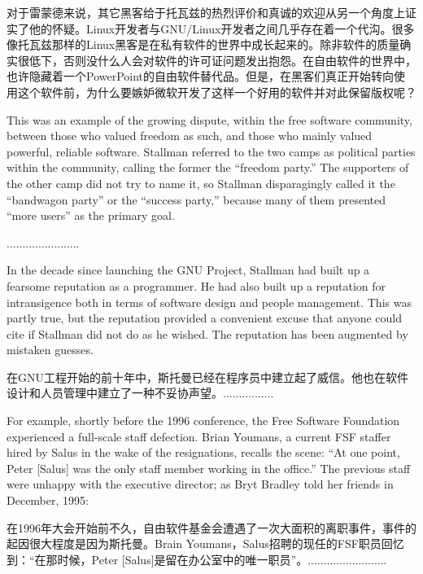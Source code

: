 \ifdefined\chs
对于雷蒙德来说，其它黑客给于托瓦兹的热烈评价和真诚的欢迎从另一个角度上证实了他的怀疑。Linux开发者与GNU/Linux开发者之间几乎存在着一个代沟。很多像托瓦兹那样的Linux黑客是在私有软件的世界中成长起来的。除非软件的质量确实很低下，否则没什么人会对软件的许可证问题发出抱怨。在自由软件的世界中，也许隐藏着一个PowerPoint的自由软件替代品。但是，在黑客们真正开始转向使用这个软件前，为什么要嫉妒微软开发了这样一个好用的软件并对此保留版权呢？
\fi

\ifdefined\eng
This was an example of the growing dispute, within the free software community, between those who valued freedom as such, and those who mainly valued powerful, reliable software.  Stallman referred to the two camps as political parties within the community, calling the former the ``freedom party.''  The supporters of the other camp did not try to name it, so Stallman disparagingly called it the ``bandwagon party'' or the ``success party,'' because many of them presented ``more
users'' as the primary goal.
\fi

\ifdefined\chs
.......................
\fi

\ifdefined\eng
In the decade since launching the GNU Project, Stallman had built up a fearsome reputation as a programmer. He had also built up a reputation for intransigence both in terms of software design and people management. This was partly true, but the reputation provided a convenient excuse that anyone could cite if Stallman did not do as he wished.  The reputation has been augmented by mistaken guesses.
\fi

\ifdefined\chs
在GNU工程开始的前十年中，斯托曼已经在程序员中建立起了威信。他也在软件设计和人员管理中建立了一种不妥协声望。................
\fi

\ifdefined\eng
For example, shortly before the 1996 conference, the Free Software Foundation experienced a full-scale staff defection.  Brian Youmans, a current FSF staffer hired by Salus in the wake of the resignations, recalls the scene: ``At one point, Peter [Salus] was the only staff member working in the office.''  The previous staff were unhappy with the executive director; as Bryt Bradley told her friends in December, 1995:
\fi

\ifdefined\chs
在1996年大会开始前不久，自由软件基金会遭遇了一次大面积的离职事件，事件的起因很大程度是因为斯托曼。Brain Youmans，Salus招聘的现任的FSF职员回忆到：``在那时候，Peter [Salus]是留在办公室中的唯一职员''。.........................
\fi

